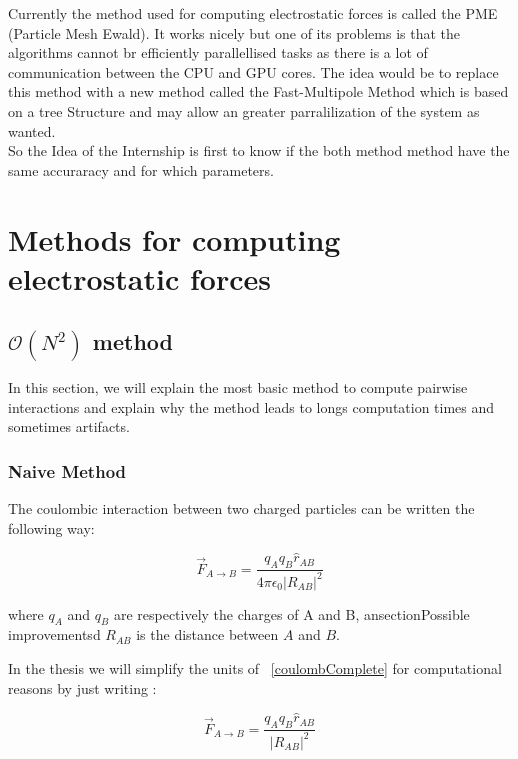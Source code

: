 \documentclass[12pt,twoside,a4paper]{report}
\begin{document}
Currently the method used for computing electrostatic forces is called the PME (Particle Mesh Ewald). It works nicely but one of its problems is that the algorithms cannot br efficiently parallellised tasks as there is a lot of communication between the CPU and GPU cores. The idea would be to replace this method with a new method called the Fast-Multipole Method which is based on a tree Structure and may allow an greater parralilization of the system as wanted.\\

So the Idea of the Internship is first to know if the both method method have the same accuraracy and for which parameters.


\chapter{Methods for computing electrostatic forces}


\section{$\mathcal{O}(N^2)$ method }


In this section, we will explain the most basic method to compute pairwise interactions and explain why the method leads to longs computation times and sometimes artifacts.

\subsection{Naive Method}

The coulombic interaction between two charged particles can be written the following way:

\begin{equation}
	\overrightarrow{F}_{A \rightarrow B} = \frac{q_A q_B \hat{r}_{AB} }{4\pi\epsilon_0|R_{AB}|^2}
	\label{coulombComplete}
\end{equation}

where $q_A $ and $q_B$ are respectively the charges of A and B, ansection{Possible improvements}d $R_{AB}$ is the distance between $A$ and $B$.

In the thesis we will simplify the units of ~\eqref{coulombComplete} for computational reasons by just writing :

\begin{equation}
	\overrightarrow{F}_{A \rightarrow B} = \frac{q_A q_B \hat{r}_{AB} }{|R_{AB}|^2}
	\label{coulombSimplified}
\end{equation}
\end{document}
